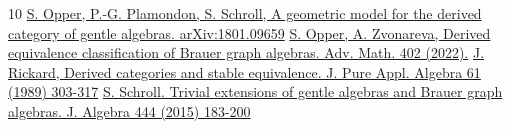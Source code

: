 \documentclass[11pt,reqno]{amsart}
\theoremstyle{plain}
\theoremstyle{definition}
\theoremstyle{remark}
\numberwithin{equation}{section}
\begin{document}
\begin{thebibliography}{10}
 \href{https://arxiv.org/abs/1801.09659}{S. Opper, P.-G. Plamondon, S. Schroll, A geometric model for the derived category of gentle algebras. arXiv:1801.09659}
 \href{https://www.sciencedirect.com/science/article/pii/S0001870822001578}{S. Opper, A. Zvonareva, Derived equivalence classification of Brauer graph algebras. Adv. Math. 402 (2022).}
 \href{https://www.sciencedirect.com/science/article/pii/0022404989900819}{J. Rickard, Derived categories and stable equivalence. J. Pure Appl. Algebra 61 (1989) 303-317}
 \href{https://www.sciencedirect.com/science/article/pii/S0021869315004093}{S. Schroll. Trivial extensions of gentle algebras and Brauer graph algebras. J. Algebra 444 (2015) 183-200}
\end{thebibliography}
\end{document}
